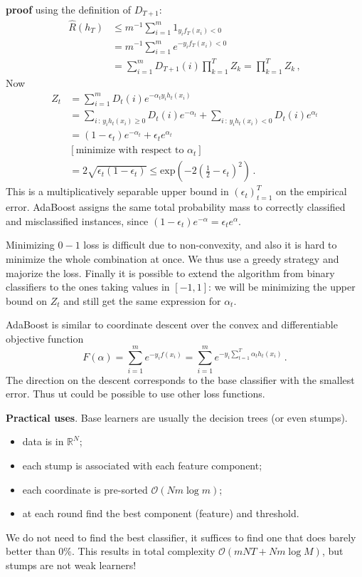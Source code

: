 \documentclass[a4paper]{article}
\newcommand{\Real}{\mathbb{R}}
\begin{document}
\textbf{proof} using the definition of $D_{T+1}$:
\begin{align*}
    \hat{R}(h_T)
        &\leq m^{-1}\sum_{i=1}^m 1_{y_i f_T(x_i) < 0} \\
        &= m^{-1}\sum_{i=1}^m e^{- y_i f_T(x_i) < 0} \\
        &= \sum_{i=1}^m D_{T+1}(i) \prod_{k=1}^T Z_k
        = \prod_{k=1}^T Z_k \,,
\end{align*}
Now
\begin{align*}
    Z_t &= \sum_{i=1}^m D_t(i) e^{-\alpha_t y_i h_t(x_i)} \\
        &= \sum_{i\,:\,y_i h_t(x_i) \geq 0} D_t(i) e^{-\alpha_t} 
            + \sum_{i\,:\,y_i h_t(x_i) < 0} D_t(i) e^{\alpha_t} \\
        &= (1-\epsilon_t) e^{-\alpha_t} + \epsilon_t e^{\alpha_t} \\
        & [\text{minimize with respect to }\alpha_t ]\\
        &= 2\sqrt{\epsilon_t(1-\epsilon_t)}
        \leq \text{exp}(-2(\frac{1}{2} - \epsilon_t)^2) \,.
\end{align*}
This is a multiplicatively separable upper bound in $(\epsilon_t)_{t=1}^T$ on the
empirical error. AdaBoost assigns the same total probability mass to correctly classified
and misclassified instances, since $(1-\epsilon_t)e^{-\alpha} = \epsilon_t e^\alpha$.

Minimizing $0-1$ loss is difficult due to non-convexity, and also it is hard to
minimize the whole combination at once. We thus use a greedy strategy and majorize
the loss. Finally it is possible to extend the algorithm from binary classifiers
to the ones taking values in $[-1,1]$: we will be minimizing the upper bound on
$Z_t$ and still get the same expression for $\alpha_t$.

AdaBoost is similar to coordinate descent over the convex and differentiable objective
function
\[ F(\alpha)
    = \sum_{i=1}^m e^{-y_i f(x_i)}
    = \sum_{i=1}^m e^{-y_i \sum_{t=1}^T \alpha_t h_t(x_i)} 
    \,.\]
The direction on the descent corresponds to the base classifier with the smallest
error. Thus ut could be possible to use other loss functions.

\textbf{Practical uses}. Base learners are usually the decision trees (or even stumps).
\begin{itemize}
    \item data is in $\Real^N$;
    \item each stump is associated with each feature component;
    \item each coordinate is pre-sorted $\mathcal{O}(N m \log m)$;
    \item at each round find the best component (feature) and threshold.
\end{itemize}
We do not need to find the best classifier, it suffices to find one that does barely
better than $0\%$. This results in total complexity $\mathcal{O}(mNT + Nm \log M)$,
but stumps are not weak learners!
\end{document}
